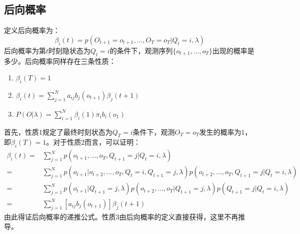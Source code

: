 \documentclass[UTF8, 12pt]{ctexart}
\begin{document}
	
	\subsection{后向概率}
	定义后向概率为：
	\begin{equation}
		\beta_{i}(t)=p(O_{t+1}=o_{t+1},...,O_{T}=o_{T}|Q_{t}=i,\lambda)
	\end{equation}
	后向概率为第$t$时刻隐状态为$Q_{t}=i$的条件下，观测序列$\{o_{t+1}, ..., o_{T}\}$出现的概率是多少。后向概率同样存在三条性质：
	\begin{enumerate}
		\item $\beta_{i}(T) = 1$
		\item $\beta_{i}(t) = \sum \limits_{j=1}^{N} {a_{ij}b_{j}(o_{t+1})\beta_{j}(t+1)}$
		\item $P(O|\lambda) = \sum \limits_{i=1}^{N} \beta_{i}(1) \pi_{i} b_{i}(o_{1})$
	\end{enumerate}

	首先，性质1规定了最终时刻状态为$Q_{T}=i$条件下，观测$O_{T}=o_{T}$发生的概率为1，即$\beta_{i}(T) = 1$。对于性质2而言，可以证明：
	\begin{align}
		\beta_{i}(t) = {} & \sum \limits_{j=1}^{N} { p(o_{t+1}, ..., o_{T}, Q_{t+1}=j|Q_{t}=i, \lambda) } \\
		= {} & \sum \limits_{j=1}^{N} { p(o_{t+1}|o_{t+2}, ..., o_{T}, Q_{t}=i, Q_{t+1}=j, \lambda)p(o_{t+2}, ..., o_{T}, Q_{t+1}=j|Q_{t}=i, \lambda) } \\
		= {} & \sum \limits_{j=1}^{N} { p(o_{t+1}|Q_{t+1}=j, \lambda)p(o_{t+2}, ..., o_{T}|Q_{t+1}=j, \lambda)p(Q_{t+1}=j|Q_{t}=i, \lambda)} \\
		= {} & \sum \limits_{j=1}^{N} {[a_{ij}b_{j}(o_{t+1})]\beta_{j}(t+1)}
	\end{align}
	由此得证后向概率的递推公式。性质3由后向概率的定义直接获得，这里不再推导。
	
	
\end{document}
